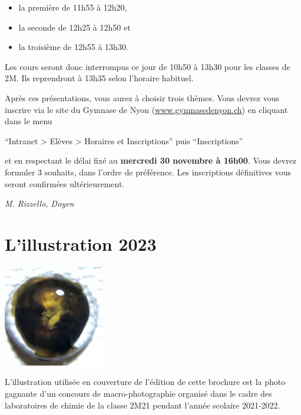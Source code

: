 \documentclass[
  10pt,
  french,
  a5paper,
  openany]{book}
\providecommand{\tightlist}{%
  \setlength{\itemsep}{0pt}\setlength{\parskip}{0pt}}
\newenvironment{signature}{\begin{flushright}}{\end{flushright}}
\begin{document}
\begin{itemize}
\tightlist
\item
  la première de 11h55 à 12h20,
\item
  la seconde de 12h25 à 12h50 et
\item
  la troisième de 12h55 à 13h30.
\end{itemize}

Les cours seront donc interrompus ce jour de 10h50 à 13h30 pour les classes de 2M. Ils reprendront à 13h35 selon l'horaire habituel.

Après ces présentations, vous aurez à choisir trois thèmes. Vous devrez vous inscrire via le site du Gymnase de Nyon (\url{www.gymnasedenyon.ch}) en cliquant dans le menu

\begin{center}
``Intranet \textgreater{} Elèves \textgreater{} Horaires et Inscriptions'' puis ``Inscriptions''

\end{center}

et en respectant le délai fixé au \textbf{mercredi 30 novembre à 16h00}. Vous devrez formuler 3 souhaits, dans l'ordre de préférence. Les inscriptions définitives vous seront confirmées ultérieurement.

\begin{signature}
\emph{M. Rizzello, Doyen}

\end{signature}

\hypertarget{lillustration-2023}{%
\chapter*{L'illustration 2023}\label{lillustration-2023}}

\begin{center}
\includegraphics[width=\textwidth,height=12em]{cover.jpg}

\end{center}

L'illustration utilisée en couverture de l'édition de cette brochure est la photo gagnante d'un concours de macro-photographie organisé dans le cadre des laboratoires de chimie de la classe 2M21 pendant l'année scolaire 2021-2022.
\end{document}
